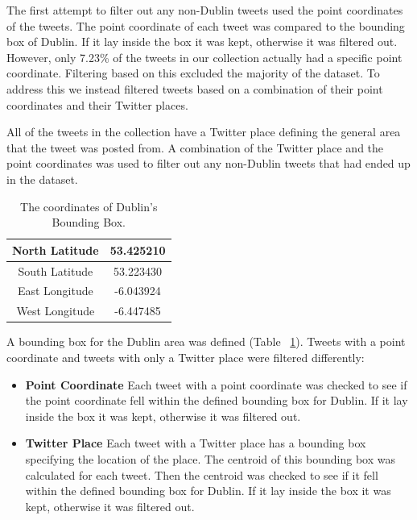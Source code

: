 The first attempt to filter out any non-Dublin tweets used the point coordinates of the tweets. The point coordinate of each tweet was compared to the bounding box of Dublin. If it lay inside the box it was kept, otherwise it was filtered out. However, only 7.23\% of the tweets in our collection actually had a specific point coordinate. Filtering based on this excluded the majority of the dataset. To address this we instead filtered tweets based on a combination of their point coordinates and their Twitter places.

All of the tweets in the collection have a Twitter place defining the general area that the tweet was posted from. A combination of the Twitter place and the point coordinates was used to filter out any non-Dublin tweets that had ended up in the dataset. 

\begin{table}[h!]
\caption{The coordinates of Dublin's Bounding Box.}
\label{tab:dublinbb}
\setlength\extrarowheight{5pt}
\begin{tabular}{|c|c|}
\hline
North Latitude  & 53.425210 \\ \hline
South Latitude  & 53.223430 \\ \hline
East Longitude & -6.043924 \\ \hline
West Longitude & -6.447485 \\ \hline
\end{tabular}
\end{table}

A bounding box for the Dublin area was defined (Table ~\ref{tab:dublinbb}). Tweets with a point coordinate and tweets with only a Twitter place were filtered differently:
\begin{itemize}
    \item \textbf{Point Coordinate}\newline
    Each tweet with a point coordinate was checked to see if the point coordinate fell within the defined bounding box for Dublin. If it lay inside the box it was kept, otherwise it was filtered out.
    \item \textbf{Twitter Place}\newline
    Each tweet with a Twitter place has a bounding box specifying the location of the place. The centroid of this bounding box was calculated for each tweet. Then the centroid was checked to see if it fell within the defined bounding box for Dublin. If it lay inside the box it was kept, otherwise it was filtered out.
\end{itemize}

